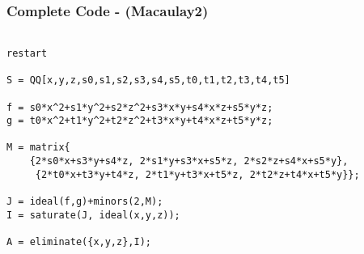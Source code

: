 \subsubsection{Complete Code - (Macaulay2)}

\begin{verbatim}

restart

S = QQ[x,y,z,s0,s1,s2,s3,s4,s5,t0,t1,t2,t3,t4,t5]

f = s0*x^2+s1*y^2+s2*z^2+s3*x*y+s4*x*z+s5*y*z;
g = t0*x^2+t1*y^2+t2*z^2+t3*x*y+t4*x*z+t5*y*z;

M = matrix{
	{2*s0*x+s3*y+s4*z, 2*s1*y+s3*x+s5*z, 2*s2*z+s4*x+s5*y},
	 {2*t0*x+t3*y+t4*z, 2*t1*y+t3*x+t5*z, 2*t2*z+t4*x+t5*y}};
	 
J = ideal(f,g)+minors(2,M);
I = saturate(J, ideal(x,y,z));

A = eliminate({x,y,z},I);

\end{verbatim}
